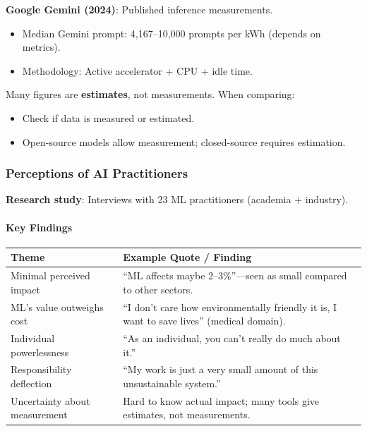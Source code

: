 \textbf{Google Gemini (2024)}: Published inference measurements.
\begin{itemize}
  \item Median Gemini prompt: 4,167--10,000 prompts per kWh (depends on metrics).
  \item Methodology: Active accelerator + CPU + idle time.
\end{itemize}

\begin{tipbox}
Many figures are \textbf{estimates}, not measurements. When comparing:
\begin{itemize}
  \item Check if data is measured or estimated.
  \item Open-source models allow measurement; closed-source requires estimation.
\end{itemize}
\end{tipbox}

\subsubsection*{Perceptions of AI Practitioners}

\textbf{Research study}: Interviews with 23 ML practitioners (academia + industry).

\paragraph*{Key Findings}

\begin{center}
\renewcommand{\arraystretch}{1.3}
\begin{tabular}{@{} l p{8cm} @{}}
\toprule
\textbf{Theme} & \textbf{Example Quote / Finding} \\
\midrule
Minimal perceived impact & ``ML affects maybe 2--3\%''---seen as small compared to other sectors. \\
ML's value outweighs cost & ``I don't care how environmentally friendly it is, I want to save lives'' (medical domain). \\
Individual powerlessness & ``As an individual, you can't really do much about it.'' \\
Responsibility deflection & ``My work is just a very small amount of this unsustainable system.'' \\
Uncertainty about measurement & Hard to know actual impact; many tools give estimates, not measurements. \\
\bottomrule
\end{tabular}
\end{center}

